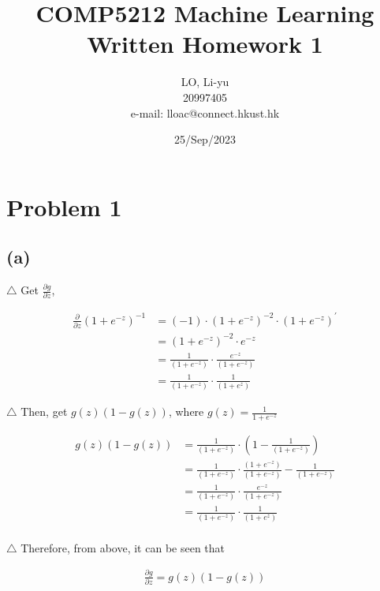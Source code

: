 \documentclass[a4paper,12pt]{article}
\begin{document}
%
   \title{\textbf{COMP5212 Machine Learning}  \\
   Written Homework 1}
      
   \author{LO, Li-yu \\ 20997405 \\ e-mail: lloac@connect.hkust.hk}
          
   \date{25/Sep/2023}

   \maketitle

   
\section*{Problem 1}
\subsection*{(a)}
\noindent $\triangle$ 
Get $\frac{\partial g}{\partial z}$,

\begin{align*}
   \frac{\partial}{\partial z}(1+e^{-z})^{-1} 
   &=(-1) \cdot (1+e^{-z})^{-2} \cdot (1+e^{-z})^{'} \\
   &=(1+e^{-z})^{-2} \cdot e^{-z} \\
   &=\frac{1}{(1+e^{-z})} \cdot \frac{e^{-z}}{(1+e^{-z})} \\
   &=\frac{1}{(1+e^{-z})} \cdot \frac{1}{(1+e^{z})}
\end{align*} 

\noindent $\triangle$
Then, get $g(z)(1-g(z))$, where $g(z)=\frac{1}{1+e^{-z}}$

\begin{align*}
   g(z)(1-g(z)) &= 
   \frac{1}{(1+e^{-z})} \cdot (1 - \frac{1}{(1+e^{-z})}) \\
   &=\frac{1}{(1+e^{-z})} \cdot \frac{(1+e^{-z})}{(1+e^{-z})} - \frac{1}{(1+e^{-z})} \\
   &=\frac{1}{(1+e^{-z})} \cdot \frac{e^{-z}}{(1+e^{-z})} \\
   &=\frac{1}{(1+e^{-z})} \cdot \frac{1}{(1+e^{z})} \\
\end{align*} 

\noindent $\triangle$
Therefore, from above, it can be seen that 

\begin{align*}
   \frac{\partial g}{\partial z} = g(z)(1-g(z)) 
\end{align*} 
\end{document}
